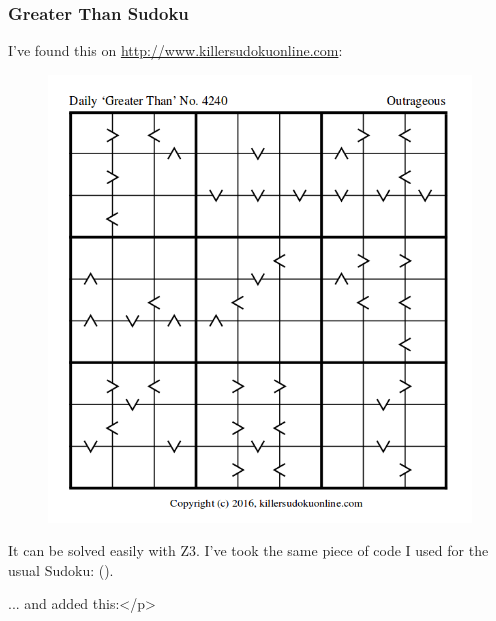 \subsubsection{Greater Than Sudoku}

I've found this on \url{http://www.killersudokuonline.com}:

\begin{figure}[H]
\centering
\includegraphics[scale=0.6]{puzzles/sudoku/GT/puzzle.png}
\caption{}
\end{figure}

It can be solved easily with Z3. I've took the same piece of code I used for the usual Sudoku: ().

... and added this:</p>


